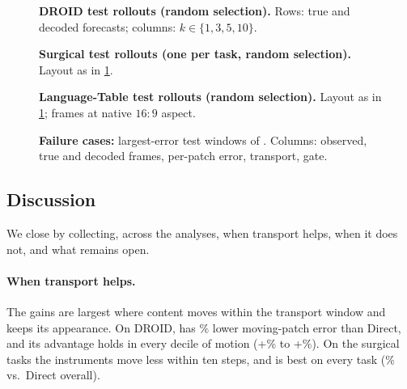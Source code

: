 \begin{figure}[tp]
  \centering
  \caption{\textbf{DROID test rollouts (random selection).} Rows: true and decoded forecasts; columns: $k\in\{1,3,5,10\}$.}
  \label{fig:gallery-droid}
\end{figure}
\begin{figure}[tp]
  \centering
  \caption{\textbf{Surgical test rollouts (one per task, random selection).} Layout as in \cref{fig:gallery-droid}.}
  \label{fig:gallery-surgical}
\end{figure}
\begin{figure}[tp]
  \centering
  \caption{\textbf{Language-Table test rollouts (random selection).} Layout as in \cref{fig:gallery-droid}; frames at native $16{:}9$ aspect.}
  \label{fig:gallery-langtable}
\end{figure}
\begin{figure}[tp]
  \centering
  \caption{\textbf{Failure cases:} largest-error test windows of \ours{}. Columns: observed, true and decoded frames, per-patch error, transport, gate.}
  \label{fig:failures}
\end{figure}


\FloatBarrier
\subsection{Discussion}\label{app:discussion}
We close by collecting, across the analyses, when transport helps, when it does not, and what remains open.
\paragraph{When transport helps.} The gains are largest where content moves within the transport window and keeps its
appearance. On DROID, \ours{} has \droidMovingVsDirect\% lower moving-patch error than Direct, and its advantage holds in
every decile of motion (+\decileMin\% to +\decileMax\%). On the surgical tasks the instruments move less within ten
steps, and \ours{} is best on every task (\hamlynVsDirect\% vs.\ Direct overall).
